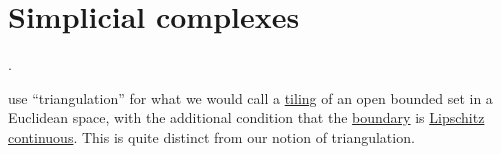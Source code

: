 \section{Simplicial complexes}\label{sec:simplicial_complexes}

\begin{definition}\label{def:triangulation}
  .
\end{definition}
\begin{comments}
  \item \Textcite[291]{AtkinsonHan2001TheoreticalNumericalAnalysis} use \enquote{triangulation} for what we would call a \hyperref[def:topological_space_tiling]{tiling} of an open bounded set in a Euclidean space, with the additional condition that the \hyperref[def:topological_boundary_operator]{boundary} is \hyperref[def:lipschitz_continuity]{Lipschitz continuous}. This is quite distinct from our notion of triangulation.
\end{comments}
